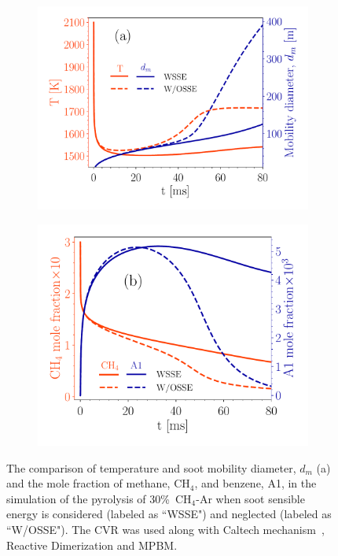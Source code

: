 \begin{figure}[H]
	\centering
	\begin{subfigure}[t]{0.43\textwidth}
		\includegraphics[width=1\textwidth]{Figures/Theory/sse_temp_dm.pdf}
	\end{subfigure}
	\begin{subfigure}[t]{0.4\textwidth}
		\includegraphics[width=1\textwidth]{Figures/Theory/sse_gasresid.pdf}
	\end{subfigure}
	\caption{The comparison of temperature and soot mobility diameter, $d_m$ (a) and the mole fraction of methane, $\mathrm{CH_4}$, and benzene, A1, in the simulation of the pyrolysis of 30\%~$\mathrm{CH_4}$-Ar when soot sensible energy is considered (labeled as ``WSSE") and neglected (labeled as ``W/OSSE"). The CVR was used along with Caltech mechanism~\citep{blanquart2009chemical}, Reactive Dimerization and MPBM.}
	\label{fig:sseeffect}
\end{figure}

